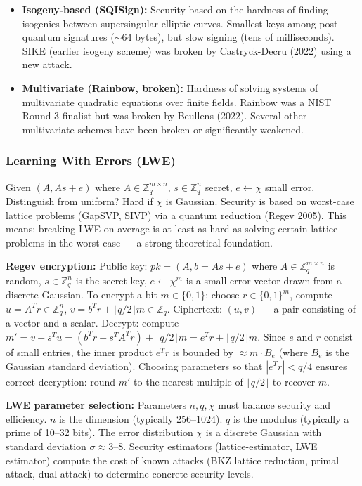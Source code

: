 \begin{itemize}
\item \textbf{Isogeny-based (SQISign):} Security based on the hardness of finding isogenies between supersingular elliptic curves. Smallest keys among post-quantum signatures ($\sim 64$ bytes), but slow signing (tens of milliseconds). SIKE (earlier isogeny scheme) was broken by Castryck-Decru (2022) using a new attack.

\item \textbf{Multivariate (Rainbow, broken):} Hardness of solving systems of multivariate quadratic equations over finite fields. Rainbow was a NIST Round 3 finalist but was broken by Beullens (2022). Several other multivariate schemes have been broken or significantly weakened.
\end{itemize}

\subsubsection*{Learning With Errors (LWE)}
Given $(A, As + e)$ where $A \in \mathbb{Z}_q^{m \times n}$, $s \in \mathbb{Z}_q^n$ secret, $e \leftarrow \chi$ small error. Distinguish from uniform? Hard if $\chi$ is Gaussian. Security is based on worst-case lattice problems (GapSVP, SIVP) via a quantum reduction (Regev 2005). This means: breaking LWE on average is at least as hard as solving certain lattice problems in the worst case — a strong theoretical foundation.

\textbf{Regev encryption:} Public key: $pk = (A, b = As + e)$ where $A \in \mathbb{Z}_q^{m \times n}$ is random, $s \in \mathbb{Z}_q^n$ is the secret key, $e \leftarrow \chi^m$ is a small error vector drawn from a discrete Gaussian. To encrypt a bit $m \in \{0,1\}$: choose $r \in \{0,1\}^m$, compute $u = A^T r \in \mathbb{Z}_q^n$, $v = b^T r + \lfloor q/2 \rfloor m \in \mathbb{Z}_q$. Ciphertext: $(u, v)$ — a pair consisting of a vector and a scalar. Decrypt: compute $m' = v - s^T u = (b^T r - s^T A^T r) + \lfloor q/2 \rfloor m = e^T r + \lfloor q/2 \rfloor m$. Since $e$ and $r$ consist of small entries, the inner product $e^T r$ is bounded by $\approx m \cdot B_e$ (where $B_e$ is the Gaussian standard deviation). Choosing parameters so that $|e^T r| < q/4$ ensures correct decryption: round $m'$ to the nearest multiple of $\lfloor q/2 \rfloor$ to recover $m$.

\textbf{LWE parameter selection:} Parameters $n, q, \chi$ must balance security and efficiency. $n$ is the dimension (typically 256--1024). $q$ is the modulus (typically a prime of 10--32 bits). The error distribution $\chi$ is a discrete Gaussian with standard deviation $\sigma \approx 3$--$8$. Security estimators (lattice-estimator, LWE estimator) compute the cost of known attacks (BKZ lattice reduction, primal attack, dual attack) to determine concrete security levels.

